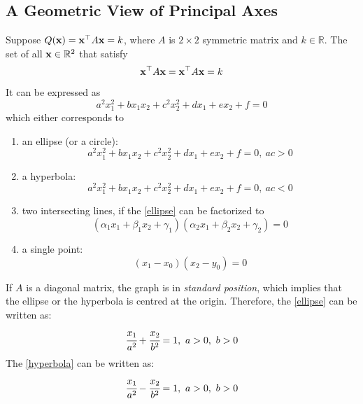     \subsection{A Geometric View of Principal Axes}
    Suppose $Q(\mathbf{x}) = \mathbf{x}^{\top}A\mathbf{x} = k$, where $A$ is $2\times 2$ symmetric matrix and $k\in\mathbb{R}$.
    The set of all $\mathbf{x}\in\mathbb{R}^2$ that satisfy
    \begin{equation*}
        \mathbf{x}^{\top}A\mathbf{x} = \mathbf{x}^{\top}A\mathbf{x} = k
    \end{equation*}
    It can be expressed as
    \begin{equation*}
        a^2x_1^2 + bx_1x_2 + c^2x_2^2 + dx_1 + ex_2 + f = 0
    \end{equation*}
    which either corresponds to 
    \begin{enumerate}
        \item an ellipse (or a circle):
        \begin{equation}\label{ellipse}
            a^2x_1^2 + bx_1x_2 + c^2x_2^2 + dx_1 + ex_2 + f = 0,\ ac> 0
        \end{equation}
        \item a hyperbola:
        \begin{equation}\label{hyperbola}
            a^2x_1^2 + bx_1x_2 + c^2x_2^2 + dx_1 + ex_2 + f = 0,\ ac < 0
        \end{equation}
        \item two intersecting lines, if the \cref{ellipse} can be factorized to
        \begin{equation*}
            (\alpha_1x_1 + \beta_1x_2 + \gamma_1)(\alpha_2x_1 + \beta_2x_2 + \gamma_2) = 0
        \end{equation*}
        \item a single point:
        \begin{equation*}
            (x_1 - x_0)(x_2 - y_0) = 0
        \end{equation*}
    \end{enumerate}
    If $A$ is a diagonal matrix, the graph is in \textit{standard position}, which implies that the ellipse or the hyperbola is centred at the origin. Therefore, the \cref{ellipse} can be written as:
    \begin{equation*}
        \cfrac{x_1}{a^2} + \cfrac{x_2}{b^2} = 1,\ a>0,\ b > 0
    \end{equation*}
    The \cref{hyperbola} can be written as:
    \begin{equation*}
        \cfrac{x_1}{a^2} - \cfrac{x_2}{b^2} = 1,\ a>0,\ b > 0
    \end{equation*}
